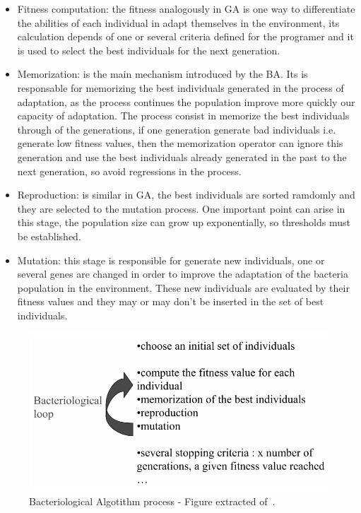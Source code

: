 \begin{itemize}
	\item Fitness computation: the fitness analogously in GA is one way to 	
	differentiate the abilities of each individual in adapt themselves in the
	environment, its calculation depends of one or several criteria defined for 
	the programer and it is used to select the best individuals for the next generation.

	\item Memorization: is the main mechanism introduced by the BA. Its is responsable
	for memorizing the best individuals generated in the process of adaptation,
	as the process continues the population improve more quickly our capacity of
	adaptation. The process consist in memorize the best individuals through of 
	the	generations, if one generation generate bad individuals i.e. generate low
	fitness values, then the memorization operator can ignore this generation and
	use the best individuals already generated in the past to the next generation,
	so avoid regressions in the process.

	\item Reproduction: is similar in GA, the best individuals are sorted ramdomly
	and they are selected to the mutation process. One important point can arise
	in this stage, the population size can grow up exponentially, so thresholds
	must be established.

	\item Mutation: this stage is responsible for generate new individuals, one
	or several genes are changed in order to improve the adaptation of the bacteria
	population in the environment. These new individuals are evaluated by their
	fitness values and they may or may don't be inserted in the set of best
	individuals.

\end{itemize}

\begin{figure}[htbp]
	\centering
	\includegraphics[width=\columnwidth]{img/ba.png}
	\caption{Bacteriological Algotithm process - Figure extracted of~\cite{baudry}.}\label{fig:ba}
\end{figure}

